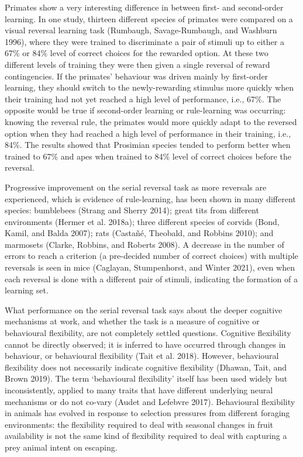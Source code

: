 \documentclass[
]{article}
\begin{document}
Primates show a very interesting difference in between first- and second-order learning. In one study, thirteen different species of primates were compared on a visual reversal learning task (Rumbaugh, Savage-Rumbaugh, and Washburn 1996), where they were trained to discriminate a pair of stimuli up to either a 67\% or 84\% level of correct choices for the rewarded option. At these two different levels of training they were then given a single reversal of reward contingencies. If the primates' behaviour was driven mainly by first-order learning, they should switch to the newly-rewarding stimulus more quickly when their training had not yet reached a high level of performance, i.e., 67\%. The opposite would be true if second-order learning or rule-learning was occurring: knowing the reversal rule, the primates would more quickly adapt to the reversed option when they had reached a high level of performance in their training, i.e., 84\%. The results showed that Prosimian species tended to perform better when trained to 67\% and apes when trained to 84\% level of correct choices before the reversal.

Progressive improvement on the serial reversal task as more reversals are experienced, which is evidence of rule-learning, has been shown in many different species: bumblebees (Strang and Sherry 2014); great tits from different environments (Hermer et al. 2018a); three different species of corvids (Bond, Kamil, and Balda 2007); rats (Castañé, Theobald, and Robbins 2010); and marmosets (Clarke, Robbins, and Roberts 2008). A decrease in the number of errors to reach a criterion (a pre-decided number of correct choices) with multiple reversals is seen in mice (Caglayan, Stumpenhorst, and Winter 2021), even when each reversal is done with a different pair of stimuli, indicating the formation of a learning set.

What performance on the serial reversal task says about the deeper cognitive mechanisms at work, and whether the task is a measure of cognitive or behavioural flexibility, are not completely settled questions. Cognitive flexibility cannot be directly observed; it is inferred to have occurred through changes in behaviour, or behavioural flexibility (Tait et al. 2018). However, behavioural flexibility does not necessarily indicate cognitive flexibility (Dhawan, Tait, and Brown 2019). The term `behavioural flexibility' itself has been used widely but inconsistently, applied to many traits that have different underlying neural mechanisms or do not co-vary (Audet and Lefebvre 2017). Behavioural flexibility in animals has evolved in response to selection pressures from different foraging environments: the flexibility required to deal with seasonal changes in fruit availability is not the same kind of flexibility required to deal with capturing a prey animal intent on escaping.
\end{document}
